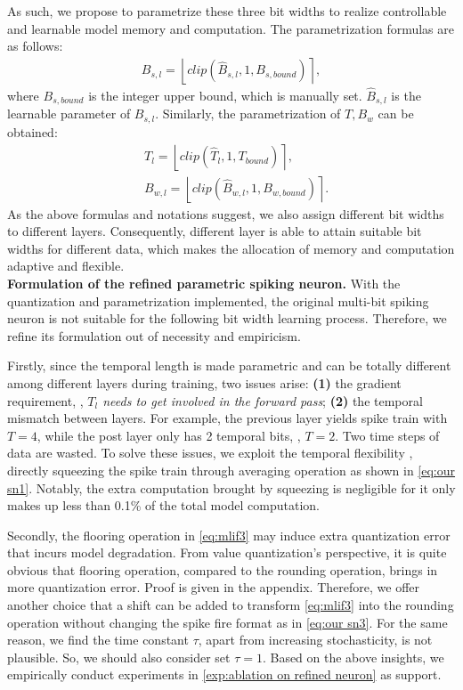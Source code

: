 As such, we propose to parametrize these three bit widths to realize controllable and learnable model memory and computation. The parametrization formulas are as follows:
\begin{align}
    B_{s,l} = \left \lfloor clip(\hat{B}_{s,l},1,B_{s,bound})\right \rceil,\label{eq:spike bit param}
\end{align}
where $B_{s,bound}$ is the integer upper bound, which is manually set. $\hat{B}_{s,l}$ is the learnable parameter of $B_{s,l}$. Similarly, 
the parametrization of $T,B_w$ can be obtained:
\begin{align}
    &T_{l} = \left \lfloor clip(\hat{T}_{l},1,T_{bound})\right \rceil,\label{eq:spike len param}\\
    &B_{w,l} = \left \lfloor clip(\hat{B}_{w,l},1,B_{w,bound})\right \rceil.\label{eq:weight bit param}
\end{align}
As the above formulas and notations suggest, we also assign different bit widths to different layers. Consequently, different layer is able to attain suitable bit widths for different data, which makes the allocation of memory and computation adaptive and flexible.
\\\textbf{Formulation of the refined parametric spiking neuron.} 
With the quantization and parametrization implemented, the original multi-bit spiking neuron is not suitable for the following bit width learning process. Therefore, we refine its formulation out of necessity and empiricism.

Firstly, since the temporal length is made parametric and can be totally different among different layers during
training, two issues arise: \textbf{(1)} the gradient requirement, \ie, \emph{$T_{l}$ needs to get involved in the forward pass}; \textbf{(2)} the temporal mismatch between layers. 
For example, the previous layer yields spike train with $T=4$, while the post layer only has 2 temporal bits, \ie, $T=2$. Two time steps of data are wasted. 
To solve these issues, we exploit the temporal flexibility \cite{yao2021temporal}, directly squeezing the spike train through averaging operation as shown in  \cref{eq:our sn1}. Notably, the extra computation brought by squeezing is negligible for it only makes up less than 0.1\% of the total model computation. 

Secondly, the flooring operation in  \cref{eq:mlif3} may induce extra quantization error that incurs model degradation. 
From  value quantization's perspective, it is quite obvious that
flooring operation, compared to the rounding operation, brings in more quantization error. Proof is given in the appendix. Therefore, we offer another choice that a shift can be added to transform  \cref{eq:mlif3} into the rounding operation without changing the spike fire format as in  \cref{eq:our sn3}. For the same reason, we find the time constant $\tau$, apart from increasing stochasticity, is not plausible. So, we should also consider set $\tau=1$. Based on the above insights, we empirically conduct experiments in  \cref{exp:ablation on refined neuron} as support.


